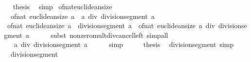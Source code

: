 \begin{isabellebody}
\ \isamarkupfalse%
\ {\isacharquery}{\kern0pt}thesis\ \isamarkupfalse%
\ simp\isanewline
{}\isamarkupfalse%
%
\endisatagproof
{\isafoldproof}%
%
\isadelimproof
\isanewline
%
\endisadelimproof
\isanewline
{}\isamarkupfalse%
\ of{\isacharunderscore}{\kern0pt}nat{\isacharunderscore}{\kern0pt}euclidean{\isacharunderscore}{\kern0pt}size{\isacharcolon}{\kern0pt}\isanewline
\ \ {\isachardoublequoteopen}of{\isacharunderscore}{\kern0pt}nat\ {\isacharparenleft}{\kern0pt}euclidean{\isacharunderscore}{\kern0pt}size\ a{\isacharparenright}{\kern0pt}\ {\isacharequal}{\kern0pt}\ a\ div\ division{\isacharunderscore}{\kern0pt}segment\ a{\isachardoublequoteclose}\isanewline
%
\isadelimproof
%
\endisadelimproof
%
\isatagproof
{}\isamarkupfalse%
\ {\isacharminus}{\kern0pt}\isanewline
\ \ \isamarkupfalse%
\ {\isachardoublequoteopen}of{\isacharunderscore}{\kern0pt}nat\ {\isacharparenleft}{\kern0pt}euclidean{\isacharunderscore}{\kern0pt}size\ a{\isacharparenright}{\kern0pt}\ {\isacharequal}{\kern0pt}\ division{\isacharunderscore}{\kern0pt}segment\ a\ {\isacharasterisk}{\kern0pt}\ of{\isacharunderscore}{\kern0pt}nat\ {\isacharparenleft}{\kern0pt}euclidean{\isacharunderscore}{\kern0pt}size\ a{\isacharparenright}{\kern0pt}\ div\ division{\isacharunderscore}{\kern0pt}segment\ a{\isachardoublequoteclose}\isanewline
\ \ \ \ \isamarkupfalse%
\ {\isacharparenleft}{\kern0pt}subst\ nonzero{\isacharunderscore}{\kern0pt}mult{\isacharunderscore}{\kern0pt}div{\isacharunderscore}{\kern0pt}cancel{\isacharunderscore}{\kern0pt}left{\isacharparenright}{\kern0pt}\ simp{\isacharunderscore}{\kern0pt}all\isanewline
\ \ \isamarkupfalse%
\ \isamarkupfalse%
\ {\isachardoublequoteopen}{\isasymdots}\ {\isacharequal}{\kern0pt}\ a\ div\ division{\isacharunderscore}{\kern0pt}segment\ a{\isachardoublequoteclose}\isanewline
\ \ \ \ \isamarkupfalse%
\ simp\isanewline
\ \ \isamarkupfalse%
\ \isamarkupfalse%
\ {\isacharquery}{\kern0pt}thesis\ \isacommand{{\isachardot}{\kern0pt}}\isamarkupfalse%
\isanewline
{}\isamarkupfalse%
%
\endisatagproof
{\isafoldproof}%
%
\isadelimproof
\isanewline
%
\endisadelimproof
\isanewline
{}\isamarkupfalse%
\ division{\isacharunderscore}{\kern0pt}segment{\isacharunderscore}{\kern0pt}{}\ {\isacharbrackleft}{\kern0pt}simp{\isacharbrackright}{\kern0pt}{\isacharcolon}{\kern0pt}\isanewline
\ \ {\isachardoublequoteopen}division{\isacharunderscore}{\kern0pt}segment\ {}\ {\isacharequal}{\kern0pt}\ {}{\isachardoublequoteclose}\isanewline

\end{isabellebody}
